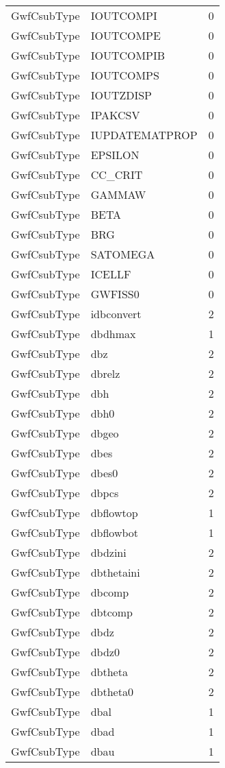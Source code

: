\begin{longtable}{p{6cm} p{4cm} p{2cm} }
GwfCsubType &  IOUTCOMPI & 0 \\ 
GwfCsubType &  IOUTCOMPE & 0 \\ 
GwfCsubType &  IOUTCOMPIB & 0 \\ 
GwfCsubType &  IOUTCOMPS & 0 \\ 
GwfCsubType &  IOUTZDISP & 0 \\ 
GwfCsubType &  IPAKCSV & 0 \\ 
GwfCsubType &  IUPDATEMATPROP & 0 \\ 
GwfCsubType &  EPSILON & 0 \\ 
GwfCsubType &  CC\_CRIT & 0 \\ 
GwfCsubType &  GAMMAW & 0 \\ 
GwfCsubType &  BETA & 0 \\ 
GwfCsubType &  BRG & 0 \\ 
GwfCsubType &  SATOMEGA & 0 \\ 
GwfCsubType &  ICELLF & 0 \\ 
GwfCsubType &  GWFISS0 & 0 \\ 
GwfCsubType & idbconvert & 2 \\ 
GwfCsubType & dbdhmax & 1 \\ 
GwfCsubType & dbz & 2 \\ 
GwfCsubType & dbrelz & 2 \\ 
GwfCsubType & dbh & 2 \\ 
GwfCsubType & dbh0 & 2 \\ 
GwfCsubType & dbgeo & 2 \\ 
GwfCsubType & dbes & 2 \\ 
GwfCsubType & dbes0 & 2 \\ 
GwfCsubType & dbpcs & 2 \\ 
GwfCsubType & dbflowtop & 1 \\ 
GwfCsubType & dbflowbot & 1 \\ 
GwfCsubType & dbdzini & 2 \\ 
GwfCsubType & dbthetaini & 2 \\ 
GwfCsubType & dbcomp & 2 \\ 
GwfCsubType & dbtcomp & 2 \\ 
GwfCsubType & dbdz & 2 \\ 
GwfCsubType & dbdz0 & 2 \\ 
GwfCsubType & dbtheta & 2 \\ 
GwfCsubType & dbtheta0 & 2 \\ 
GwfCsubType & dbal & 1 \\ 
GwfCsubType & dbad & 1 \\ 
GwfCsubType & dbau & 1 \\ 

\end{longtable}
